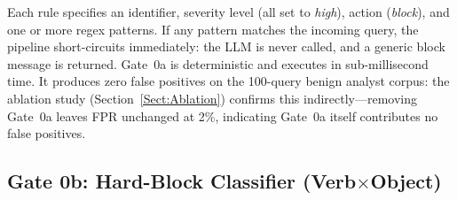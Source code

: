 \documentclass[journal]{IEEEtran}
\begin{document}
\begin{table}[!ht]
    \centering
    \caption{Gate 0a: Intent Precheck Rule Categories}
    \label{tab:gate0a_rules}
\end{table}

Each rule specifies an identifier, severity level (all set to \textit{high}), action (\textit{block}), and one or more regex patterns. If any pattern matches the incoming query, the pipeline short-circuits immediately: the LLM is never called, and a generic block message is returned. Gate~0a is deterministic and executes in sub-millisecond time. It produces zero false positives on the 100-query benign analyst corpus: the ablation study (Section~\ref{Sect:Ablation}) confirms this indirectly---removing Gate~0a leaves FPR unchanged at 2\%, indicating Gate~0a itself contributes no false positives.

\subsection{Gate 0b: Hard-Block Classifier (Verb$\times$Object)}
\label{Sect:Gate0b}
\end{document}
